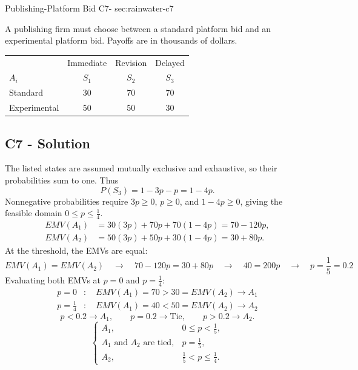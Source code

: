 \sectionScored
	{Publishing-Platform Bid}
	{C7-}
	{sec:rainwater-c7}
	{
	A publishing firm must choose between a standard platform bid and an experimental platform bid. Payoffs are in thousands of dollars.
		\begin{center}\setlength{\tabcolsep}{2pt}\renewcommand{\arraystretch}{1.1}
			\begin{tabular}{lccc}\toprule
				&Immediate&Revision&Delayed\\ 
				$A_i$&$S_1$&$S_2$&$S_3$\\ 
				\midrule
				Standard&30&70&70\\
				Experimental&50&50&30\\ \bottomrule
			\end{tabular}
		\end{center}


	\label{subsec:rainwater-c7-solution}
	\subsection*{C7 - Solution }

	The listed states are assumed mutually exclusive and exhaustive, so their probabilities sum to one. Thus
		\[
		P(S_3)=1-3p-p=1-4p.
		\]
		Nonnegative probabilities require $3p\ge0$, $p\ge0$, and $1-4p\ge0$, giving the feasible domain $0\le p\le\frac{1}{4}$.
		\begin{align*}
EMV(A_1)&=30(3p)+70p+70(1-4p)=70-120p,\\
			EMV(A_2)&=50(3p)+50p+30(1-4p)=30+80p.
		\end{align*}
		At the threshold, the EMVs are equal:
		\[
		EMV(A_1) = EMV(A_2)
		\quad \longrightarrow \quad
		70-120p=30+80p
		\quad \longrightarrow \quad
		40=200p
		\quad \longrightarrow \quad
		p=\frac{1}{5}=0.2
		\]
		Evaluating both EMVs at $p=0$ and $p=\frac{1}{4}$:
		\[
		\begin{aligned}
			p=0 &: \quad
			EMV(A_1)=70 > 30=EMV(A_2)
			\longrightarrow A_1\\
			p=\frac{1}{4} &: \quad
			EMV(A_1)=40 < 50=EMV(A_2)
			\longrightarrow A_2
		\end{aligned}
		\]
		\[
		p<0.2 \longrightarrow A_1,\qquad
		p=0.2 \longrightarrow \text{Tie},\qquad
		p>0.2 \longrightarrow A_2.
		\]
		\[
		\boxed{\begin{cases}
				A_1,&0\le p<\frac{1}{5},\\
				A_1\text{ and }A_2\text{ are tied},&p=\frac{1}{5},\\
				A_2,&\frac{1}{5}<p\le\frac{1}{4}.
		\end{cases}}
		\]

	}

